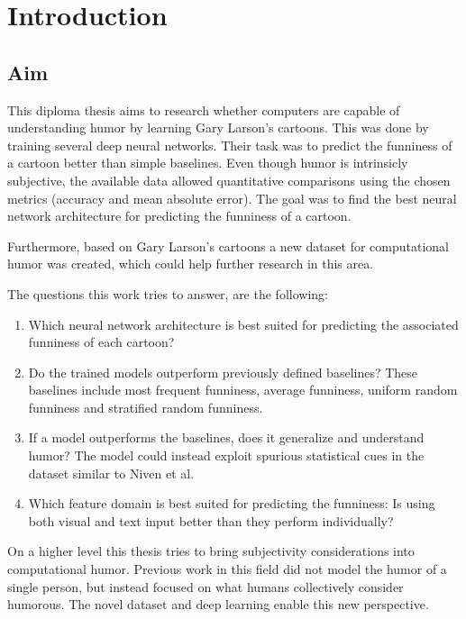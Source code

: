 \documentclass[draft,final,oneside]{vutinfth} %
\begin{document}
\chapter{Introduction}

\section{Aim} \label{aim}
This diploma thesis aims to research whether computers are capable of understanding humor by learning Gary Larson's cartoons. This was done by training several deep neural networks. Their task was to predict the funniness of a cartoon better than simple baselines. Even though humor is intrinsicly subjective, the available data allowed quantitative comparisons using the chosen metrics (accuracy and mean absolute error). The goal was to find the best neural network architecture for predicting the funniness of a cartoon.

Furthermore, based on Gary Larson's cartoons a new dataset for computational humor was created, which could help further research in this area.

The questions this work tries to answer, are the following:

\begin{enumerate}

\item Which neural network architecture is best suited for predicting the associated funniness of each cartoon?

\item Do the trained models outperform previously defined baselines? These baselines include most frequent funniness, average funniness, uniform random funniness and stratified random funniness.

\item If a model outperforms the baselines, does it generalize and understand humor? The model could instead exploit spurious statistical cues in the dataset similar to Niven et al. \cite{cleverhans}

\item Which feature domain is best suited for predicting the funniness: Is using both visual and text input better than they perform individually?

\end{enumerate}

On a higher level this thesis tries to bring subjectivity considerations into computational humor. Previous work in this field did not model the humor of a single person, but instead focused on what humans collectively consider humorous. The novel dataset and deep learning enable this new perspective.
\end{document}
